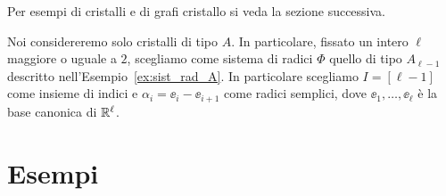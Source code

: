 
Per esempi di cristalli e di grafi cristallo si veda la sezione successiva.

Noi considereremo solo cristalli di tipo $A$.
In particolare, fissato un intero $\ell$ maggiore o uguale a $2$,
scegliamo come sistema di radici $\Phi$ quello di tipo $A_{\ell-1}$
descritto nell'Esempio~\ref{ex:sist_rad_A}.
In particolare scegliamo $I = [\ell-1]$ come insieme di indici
e $\alpha_i = \ee_i - \ee_{i+1}$ come radici semplici, dove $\ee_1, \dots, \ee_\ell$
\`e la base canonica di $\mathbb{R}^\ell$.

% 
% 

\section{Esempi}


